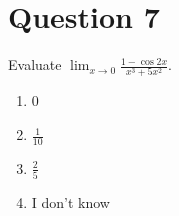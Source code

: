 
\section*{Question 7}
Evaluate $\displaystyle\lim_{x\to 0}\frac{1-\cos 2x}{x^3+5x^2}$.
    
\begin{enumerate}[label = \alph*.]
    \item 0
    \item $\displaystyle\frac{1}{10}$
    \item $\displaystyle\frac{2}{5}$
    \item I don't know
\end{enumerate}

\setcounter{solutionMainStep}{0}
\setcounter{solutionSubStep}{0}

